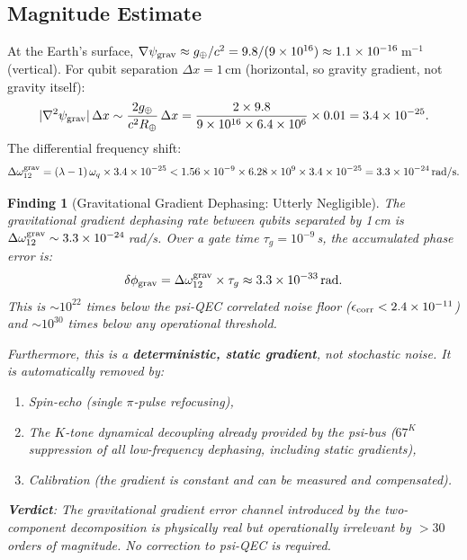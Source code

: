 \documentclass[11pt]{article}
\newtheorem{finding}[theorem]{Finding}
\theoremstyle{definition}
\theoremstyle{remark}
\newcommand{\ee}[1]{\times 10^{#1}}
\newcommand{\psigrav}{\psi_{\rm grav}}
\begin{document}
\subsection{Magnitude Estimate}
\label{sec:gradient-magnitude}

At the Earth's surface, $\nabla\psigrav \approx g_\oplus/c^2
= 9.8/(9\ee{16}) \approx 1.1\ee{-16}$\,m$^{-1}$ (vertical).
For qubit separation $\Delta x = 1$\,cm (horizontal, so gravity
gradient, not gravity itself):
\begin{equation}
  |\nabla^2\psigrav|\,\Delta x \sim \frac{2g_\oplus}{c^2 R_\oplus}
  \,\Delta x = \frac{2\times 9.8}{9\ee{16}\times 6.4\ee{6}}\times 0.01
  = 3.4\ee{-25}.
\end{equation}
The differential frequency shift:
\begin{equation}
  \Delta\omega_{12}^{\rm grav} = (\lambda-1)\,\omega_q\times 3.4\ee{-25}
  < 1.56\ee{-9}\times 6.28\ee{9}\times 3.4\ee{-25}
  = 3.3\ee{-24}\,\text{rad/s}.
\end{equation}

\begin{finding}[Gravitational Gradient Dephasing: Utterly Negligible]
\label{finding:grav-gradient-negligible}
The gravitational gradient dephasing rate between qubits separated by
1\,cm is $\Delta\omega_{12}^{\rm grav} \sim 3.3\ee{-24}$\,rad/s.
Over a gate time $\tau_g = 10^{-9}$\,s, the accumulated phase error is:
\begin{equation}
  \delta\phi_{\rm grav} = \Delta\omega_{12}^{\rm grav}\times\tau_g
  \approx 3.3\ee{-33}\,\text{rad}.
\end{equation}
This is $\sim 10^{22}$ times below the psi-QEC correlated noise floor
($\epsilon_{\rm corr} < 2.4\ee{-11}$) and $\sim 10^{30}$ times below
any operational threshold.

Furthermore, this is a \textbf{deterministic, static gradient}, not
stochastic noise.  It is automatically removed by:
\begin{enumerate}[nosep]
  \item Spin-echo (single $\pi$-pulse refocusing),
  \item The $K$-tone dynamical decoupling already provided by the
    psi-bus ($67^K$ suppression of \emph{all} low-frequency dephasing,
    including static gradients),
  \item Calibration (the gradient is constant and can be measured and
    compensated).
\end{enumerate}
\textbf{Verdict}: The gravitational gradient error channel introduced
by the two-component decomposition is physically real but operationally
irrelevant by $>30$ orders of magnitude.  No correction to psi-QEC
is required.
\end{finding}
\end{document}

